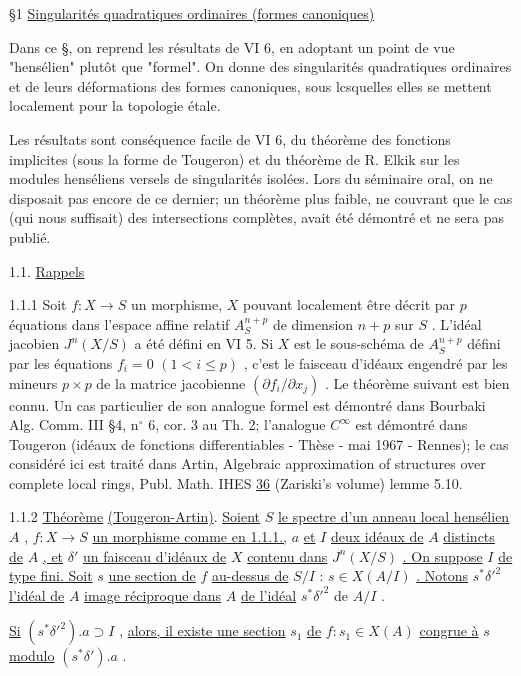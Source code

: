 \S1  \underline{Singularités quadratiques ordinaires (formes canoniques)}

Dans ce \S, on reprend les résultats de VI 6, en adoptant un point de vue "hensélien" plutôt que "formel". On donne des singularités quadratiques ordinaires et de leurs déformations des formes canoniques, sous lcsquelles elles se mettent localement pour la topologie étale.

Les résultats sont conséquence facile de VI 6, du théorème des fonctions implicites (sous la forme de Tougeron) et du théorème de R. Elkik sur les modules henséliens versels de singularités isolées. Lors du séminaire oral, on ne disposait pas encore de ce dernier; un théorème plus faible, ne couvrant que le cas (qui nous suffisait) des intersections complètes, avait été démontré et ne sera pas publié.


1.1.  \underline{Rappels}

1.1.1  Soit $f : X \to S$ un morphisme, $X$ pouvant localement être décrit par $p$ équations dans l'espace affine relatif $A_S^{n+p}$ de dimension $n+p$ sur $S$ . L'idéal jacobien $J^n(X/S)$ a été défini en VI 5. Si $X$ est le sous-schéma de $A_S^{n+p}$ défini par les équations $f_i = 0$ $(1 < i \leq p)$ , c'est le faisceau d'idéaux engendré par les mineurs $p \times p$ de la matrice jacobienne $(\partial f_i/\partial x_j)$ . Le théorème suivant est bien connu. Un cas particulier de son analogue formel est démontré dans Bourbaki Alg. Comm. III \S4, n$^{\circ}$ 6, cor. 3 au Th. 2; l'analogue $C^{\infty}$ est démontré dans Tougeron (idéaux de fonctions differentiables - Thèse - mai 1967 - Rennes); le cas considéré ici est traité dans Artin, Algebraic approximation of structures over complete local rings, Publ. Math. IHES \underline{36} (Zariski's volume) lemme 5.10.

1.1.2  \underline{Théorème} \underline{(Tougeron-Artin)}. \underline{Soient} $S$ \underline{le spectre d'un anneau local hensélien} $A$ , $f : X \to S$ \underline{un morphisme comme en 1.1.1.,} $a$ \underline{et} $I$ \underline{deux idéaux de} $A$ \underline{distincts de} $A$ \underline{, et} $\delta'$ \underline{un faisceau d'idéaux de} $X$ \underline{contenu dans} $J^n(X/S)$ \underline{. On suppose} $I$ \underline{de type fini. Soit} $s$ \underline{une section de} $f$ \underline{au-dessus de} $S/I$ : $s \in X(A/I)$ \underline{. Notons} $s^{*}\delta'^{2}$ \underline{l'idéal de} $A$ \underline{image réciproque dans} $A$ \underline{de l'idéal} $s^{*}\delta'^{2}$ de $A/I$ .

\underline{Si} $(s^{*}\delta'^{2}).a \supset I$ , \underline{alors, il existe une section} $s_1$ \underline{de} $f : s_1 \in X(A)$
\underline{congrue à} $s$ \underline{modulo} $(s^{*}\delta').a$ .

